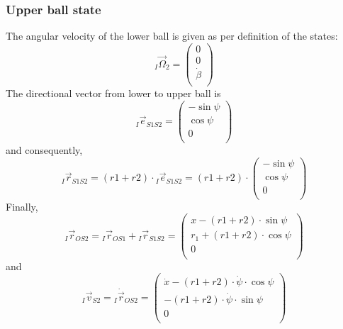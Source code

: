 \documentclass{article}
\begin{document}
\subsubsection{Upper ball state}
The angular velocity of the lower ball is given as per definition of the states:
\begin{equation}
{}_I \vec{\Omega}_2 =
\left( {\begin{array}{c} 0 \\ 0 \\ \dot{\beta} \\ \end{array} } \right)
\end{equation}
The directional vector from lower to upper ball is
\begin{equation}
{}_I \vec{e}_{S1S2} =
\left( {\begin{array}{c} -\sin{\psi} \\ \cos{\psi} \\ 0 \\ \end{array} } \right)
\end{equation}
and consequently,
\begin{equation}
{}_I \vec{r}_{S1S2} = (r1+r2) \cdot {}_I \vec{e}_{S1S2} =
(r1+r2) \cdot \left( {\begin{array}{c} -\sin{\psi} \\ \cos{\psi} \\ 0 \\ \end{array} } \right)
\end{equation}
Finally,
\begin{equation}
{}_I \vec{r}_{OS2} = {}_I \vec{r}_{OS1} + {}_I \vec{r}_{S1S2} =
\left( {\begin{array}{c} x - (r1+r2) \cdot \sin{\psi} \\ r_1 + (r1+r2) \cdot \cos{\psi} \\ 0 \\ \end{array} } \right)
\end{equation}
and
\begin{equation}
{}_I \vec{v}_{S2} = {}_I \dot{\vec{r}}_{OS2} =
\left( {\begin{array}{c} \dot{x} - (r1+r2) \cdot \dot{\psi} \cdot \cos{\psi} \\ - (r1+r2) \cdot \dot{\psi} \cdot \sin{\psi} \\ 0 \\ \end{array} } \right)
\end{equation}
\end{document}
